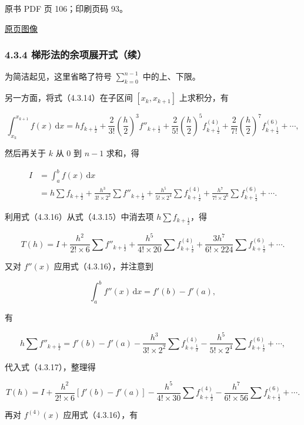 \clearpage

原书 PDF 页 106；印刷页码 93。

\href{source-images/pdf-106.jpeg}{原页图像}

\subsubsection{4.3.4 梯形法的余项展开式（续）}\label{ch04b-ux68afux5f62ux6cd5ux7684ux4f59ux9879ux5c55ux5f00ux5f0fux7eed}

为简洁起见，这里省略了符号 \(\displaystyle\sum_{k=0}^{n-1}\) 中的上、下限。

另一方面，将式（4.3.14）在子区间 \([x_k,x_{k+1}]\) 上求积分，有

\[
\int_{x_k}^{x_{k+1}}f(x)\,\mathrm{d}x
=hf_{k+\frac12}
+\frac{2}{3!}\left(\frac h2\right)^3f''_{k+\frac12}
+\frac{2}{5!}\left(\frac h2\right)^5f^{(4)}_{k+\frac12}
+\frac{2}{7!}\left(\frac h2\right)^7f^{(6)}_{k+\frac12}+\cdots,
\]

然后再关于 \(k\) 从 \(0\) 到 \(n-1\) 求和，得

\[
\begin{aligned}
I&=\int_a^b f(x)\,\mathrm{d}x\\
&=h\sum f_{k+\frac12}
+\frac{h^3}{3!\times2^2}\sum f''_{k+\frac12}
+\frac{h^5}{5!\times2^4}\sum f^{(4)}_{k+\frac12}
+\frac{h^7}{7!\times2^6}\sum f^{(6)}_{k+\frac12}+\cdots.
\end{aligned}
\tag{4.3.16}
\]

利用式（4.3.16）从式（4.3.15）中消去项 \(h\sum f_{k+\frac12}\)，得

\[
T(h)=I+\frac{h^2}{2!\times6}\sum f''_{k+\frac12}
+\frac{h^5}{4!\times20}\sum f^{(4)}_{k+\frac12}
+\frac{3h^7}{6!\times224}\sum f^{(6)}_{k+\frac12}+\cdots.
\tag{4.3.17}
\]

又对 \(f''(x)\) 应用式（4.3.16），并注意到

\[
\int_a^b f''(x)\,\mathrm{d}x=f'(b)-f'(a),
\]

有

\[
h\sum f''_{k+\frac12}=f'(b)-f'(a)
-\frac{h^3}{3!\times2^2}\sum f^{(4)}_{k+\frac12}
-\frac{h^5}{5!\times2^4}\sum f^{(6)}_{k+\frac12}+\cdots,
\]

代入式（4.3.17），整理得

\[
T(h)=I+\frac{h^2}{2!\times6}[f'(b)-f'(a)]
-\frac{h^5}{4!\times30}\sum f^{(4)}_{k+\frac12}
-\frac{h^7}{6!\times56}\sum f^{(6)}_{k+\frac12}+\cdots.
\]

再对 \(f^{(4)}(x)\) 应用式（4.3.16），有

